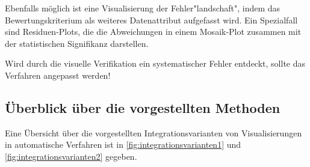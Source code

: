 				Ebenfalls möglich ist eine Visualisierung der Fehler"landschaft", indem das Bewertungskriterium als weiteres Datenattribut aufgefasst wird. Ein Spezialfall sind Residuen-Plots, die die Abweichungen in einem Mosaik-Plot zusammen mit der statistischen Signifikanz darstellen.

				Wird durch die visuelle Verifikation ein systematischer Fehler entdeckt, sollte das Verfahren angepasst werden!

		\subsection{Überblick über die vorgestellten Methoden}
			Eine Übersicht über die vorgestellten Integrationsvarianten von Visualisierungen in automatische Verfahren ist in \autoref{fig:integrationsvarianten1} und \ref{fig:integrationsvarianten2} gegeben.

